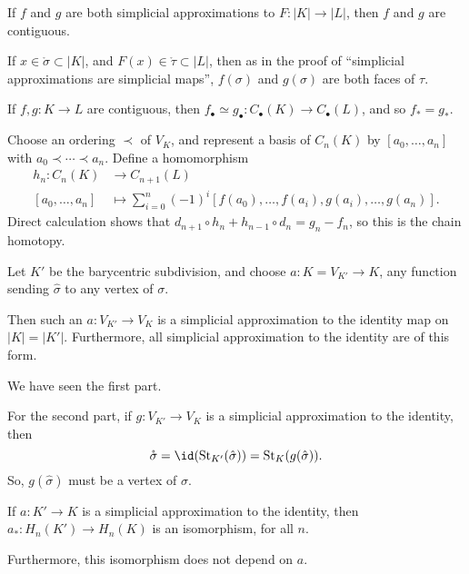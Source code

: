 \documentclass[12pt]{article}
\begin{document}
\begin{lemma}
	If $f$ and $g$ are both simplicial approximations to $F : |K| \to |L|$, then $f$ and $g$ are contiguous.
\end{lemma}

\begin{proofbox}
	If $x \in \mathring \sigma \subset |K|$, and  $F(x) \in \mathring \tau \subset |L|$, then as in the proof of ``simplicial approximations are simplicial maps'', $f(\sigma)$ and $g(\sigma)$ are both faces of $\tau$.
\end{proofbox}

\begin{lemma}
	If $f, g : K \to L$ are contiguous, then $f_\bullet \simeq g_\bullet : C_\bullet(K) \to C_\bullet(L)$, and so $f_\ast = g_\ast$.
\end{lemma}

\begin{proofbox}
	Choose an ordering $\prec$ of $V_K$, and represent a basis of $C_n(K)$ by $[a_0, \ldots, a_n]$ with $a_0 \prec \cdots \prec a_n$. Define a homomorphism
	\begin{align*}
		h_n : C_n(K) &\to C_{n+1}(L) \\
		[a_0, \ldots, a_n] &\mapsto \sum_{i = 0}^n (-1)^i [f(a_0), \ldots, f(a_i), g(a_i), \ldots, g(a_n)].
	\end{align*}
	Direct calculation shows that $d_{n+1} \circ h_n + h_{n-1} \circ d_n = g_n - f_n$, so this is the chain homotopy.
\end{proofbox}

\begin{lemma}
	Let $K'$ be the barycentric subdivision, and choose $a : K = V_{K'} \to K$, any function sending $\hat \sigma$ to any vertex of $\sigma$.

	Then such an $a : V_{K'} \to V_K$ is a simplicial approximation to the identity map on $|K| = |K'|$. Furthermore, all simplicial approximation to the identity are of this form.
\end{lemma}

\begin{proofbox}
	We have seen the first part.

	For the second part, if $g : V_{K'} \to V_K$ is a simplicial approximation to the identity, then
	\[
		\mathring \sigma = \id(\mathrm{St}_{K'}(\hat \sigma)) = \mathrm{St}_K(g(\hat \sigma)).
	\]
	So, $g(\hat \sigma)$ must be a vertex of $\sigma$.
\end{proofbox}

\begin{proposition}
	If $a : K' \to K$ is a simplicial approximation to the identity, then $a_\ast : H_n(K') \to H_n(K)$ is an isomorphism, for all $n$.

	Furthermore, this isomorphism does not depend on $a$.
\end{proposition}
\end{document}
